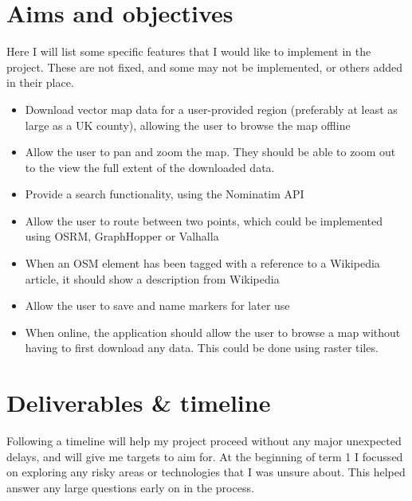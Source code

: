 \documentclass{final_report}
\begin{document}
\section{Aims and objectives}

Here I will list some specific features that I would like to implement in the project. These are not fixed, and some may not be implemented, or others added in their place.

\begin{itemize}
    \item Download vector map data for a user-provided region (preferably at least as large as a UK county), allowing the user to browse the map offline
    \item Allow the user to pan and zoom the map. They should be able to zoom out to the view the full extent of the downloaded data.
    \item Provide a search functionality, using the Nominatim API
    \item Allow the user to route between two points, which could be implemented using OSRM, GraphHopper or Valhalla
    \item When an OSM element has been tagged with a reference to a Wikipedia article, it should show a description from Wikipedia
    \item Allow the user to save and name markers for later use
    \item When online, the application should allow the user to browse a map without having to first download any data. This could be done using raster tiles.
\end{itemize}

\section{Deliverables \& timeline}

Following a timeline will help my project proceed without any major unexpected delays, and will give me targets to aim for. At the beginning of term 1 I focussed on exploring any risky areas or technologies that I was unsure about. This helped answer any large questions early on in the process.
\end{document}
